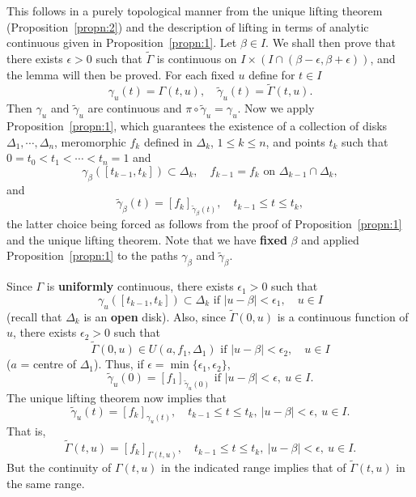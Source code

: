 \documentclass[a4paper,11pt]{article}
\begin{document}
\begin{myproof}
  This follows in a purely topological manner from the unique lifting
  theorem (Proposition~\ref{propn:2}) and the description of lifting
  in terms of analytic continuous given in Proposition~\ref{propn:1}.
  Let $\beta \in I$.  We shall then prove that there exists $\epsilon
  > 0$ such that $\widetilde{\Gamma}$ is continuous on $I \times (I
  \cap (\beta-\epsilon, \beta + \epsilon))$, and the lemma will then
  be proved.  For each fixed $u$ define for $t\in I$
  $$
  \gamma_u(t) = \Gamma(t,u),\quad \widetilde{\gamma}_u(t) =
  \widetilde{\Gamma}(t,u).
  $$
  Then $\gamma_u$ and $\widetilde{\gamma}_u$ are continuous and $\pi
  \circ \widetilde{\gamma}_u = \gamma_u$.  Now we apply
  Proposition~\ref{propn:1}, which guarantees the existence of a
  collection of disks $\Delta_1, \cdots, \Delta_n$, meromorphic $f_k$
  defined in $\Delta_k$, $1\le k\le n$, and points $t_k$ such that $0
  = t_0 < t_1 < \cdots < t_n = 1$ and
  $$
  \gamma_\beta([t_{k-1},t_k]) \subset \Delta_k,\quad
  f_{k-1} = f_k \text{ on }\Delta_{k-1}\cap \Delta_k,
  $$
  and
  $$
  \widetilde{\gamma}_\beta(t) = [f_k]_{\widetilde{\gamma}_\beta(t)},
  \quad t_{k-1} \le t \le t_k,
  $$
  the latter choice being forced as follows from the proof of
  Proposition~\ref{propn:1} and the unique lifting theorem.  Note that
  we have \textbf{fixed} $\beta$ and applied Proposition~\ref{propn:1}
  to the paths $\gamma_\beta$ and $\widetilde{\gamma}_\beta$.

  Since $\Gamma$ is \textbf{uniformly} continuous, there exists
  $\epsilon_1 > 0$ such that
  $$
  \gamma_u([t_{k-1},t_k]) \subset \Delta_k \text{ if }
  |u - \beta| < \epsilon_1, \quad u \in I
  $$
  (recall that $\Delta_k$ is an \textbf{open} disk).  Also, since
  $\widetilde{\Gamma}(0,u)$ is a continuous function of $u$, there
  exists $\epsilon_2 > 0$ such that 
  $$
  \widetilde{\Gamma}(0,u) \in U(a,f_1,\Delta_1)
  \text{ if } |u-\beta| < \epsilon_2,\quad u \in I
  $$
  ($a$ = centre of $\Delta_1$).  Thus, if $\epsilon =
  \min\{\epsilon_1, \epsilon_2\}$,
  $$
  \widetilde{\gamma}_u(0) = [f_1]_{\widetilde{\gamma}_u(0)}
  \text{ if }|u-\beta| < \epsilon,\ u\in I.
  $$
  The unique lifting theorem now implies that
  $$
  \widetilde{\gamma}_u(t) = [f_k]_{\gamma_u(t)},\quad
  t_{k-1} \le t \le t_k,\ |u-\beta| < \epsilon,\ u\in I.
  $$
  That is,
  $$
  \widetilde{\Gamma}(t,u) = [f_k]_{\Gamma(t,u)},\quad
  t_{k-1} \le t \le t_k,\ |u-\beta| < \epsilon,\ u\in I.
  $$
  But the continuity of $\Gamma(t,u)$ in the indicated range implies
  that of $\widetilde{\Gamma}(t,u)$ in the same range.
\end{myproof}
\end{document}
